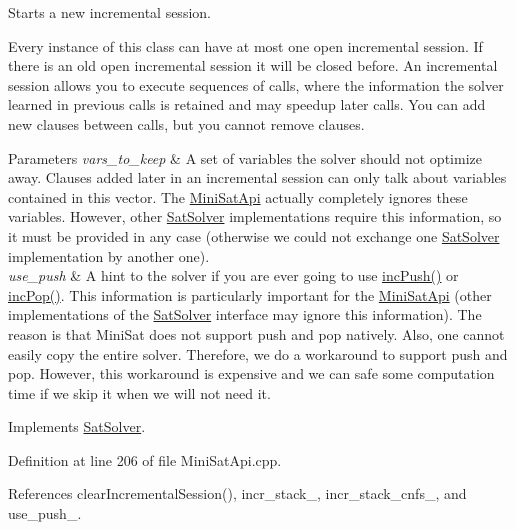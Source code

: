 Starts a new incremental session. 

Every instance of this class can have at most one open incremental session. If there is an old open incremental session it will be closed before. An incremental session allows you to execute sequences of calls, where the information the solver learned in previous calls is retained and may speedup later calls. You can add new clauses between calls, but you cannot remove clauses.


\begin{DoxyParams}{Parameters}
{\em vars\-\_\-to\-\_\-keep} & A set of variables the solver should not optimize away. Clauses added later in an incremental session can only talk about variables contained in this vector. The \hyperlink{classMiniSatApi}{Mini\-Sat\-Api} actually completely ignores these variables. However, other \hyperlink{classSatSolver}{Sat\-Solver} implementations require this information, so it must be provided in any case (otherwise we could not exchange one \hyperlink{classSatSolver}{Sat\-Solver} implementation by another one). \\
\hline
{\em use\-\_\-push} & A hint to the solver if you are ever going to use \hyperlink{classMiniSatApi_a27013ace25320f68252bef5ba9f2e9ad}{inc\-Push()} or \hyperlink{classMiniSatApi_af388f97db15f77baeb420a8fef74ca6a}{inc\-Pop()}. This information is particularly important for the \hyperlink{classMiniSatApi}{Mini\-Sat\-Api} (other implementations of the \hyperlink{classSatSolver}{Sat\-Solver} interface may ignore this information). The reason is that Mini\-Sat does not support push and pop natively. Also, one cannot easily copy the entire solver. Therefore, we do a workaround to support push and pop. However, this workaround is expensive and we can safe some computation time if we skip it when we will not need it. \\
\hline
\end{DoxyParams}


Implements \hyperlink{classSatSolver_a74603f84c3f2383a5fc44d5a8093cbea}{Sat\-Solver}.



Definition at line 206 of file Mini\-Sat\-Api.\-cpp.



References clear\-Incremental\-Session(), incr\-\_\-stack\-\_\-, incr\-\_\-stack\-\_\-cnfs\-\_\-, and use\-\_\-push\-\_\-.



